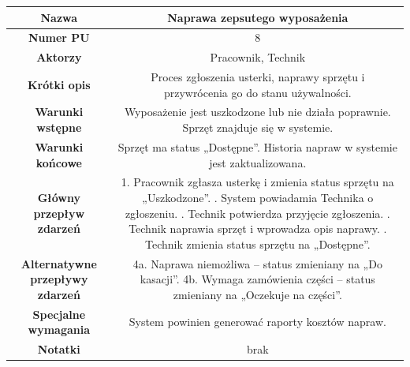 \documentclass{article}
\begin{document}
    \begin{tabular}{|c|c|}%
        \hline
        \textbf{Nazwa} & Naprawa zepsutego wyposażenia \\
        \hline
        \textbf{Numer PU} & 8 \\
        \hline
        \textbf{Aktorzy} & Pracownik, Technik \\
        \hline
        \textbf{Krótki opis} & Proces zgłoszenia usterki, naprawy sprzętu i przywrócenia go do stanu używalności. \\
        \hline
        \textbf{Warunki wstępne} & Wyposażenie jest uszkodzone lub nie działa poprawnie. Sprzęt znajduje się w systemie. \\
        \hline
        \textbf{Warunki końcowe} & Sprzęt ma status „Dostępne”. Historia napraw w systemie jest zaktualizowana. \\
        \hline
        \textbf{Główny przepływ zdarzeń} & 
            1. Pracownik zgłasza usterkę i zmienia status sprzętu na „Uszkodzone”. \newline
            2. System powiadamia Technika o zgłoszeniu. \newline
            3. Technik potwierdza przyjęcie zgłoszenia. \newline
            4. Technik naprawia sprzęt i wprowadza opis naprawy. \newline
            5. Technik zmienia status sprzętu na „Dostępne”. \\
        \hline
        \textbf{Alternatywne przepływy zdarzeń} & 
            4a. Naprawa niemożliwa – status zmieniany na „Do kasacji”. \newline
            4b. Wymaga zamówienia części – status zmieniany na „Oczekuje na części”. \\
        \hline
        \textbf{Specjalne wymagania} & System powinien generować raporty kosztów napraw. \\
        \hline
        \textbf{Notatki} & brak \\
        \hline
    \end{tabular}
\end{document}

